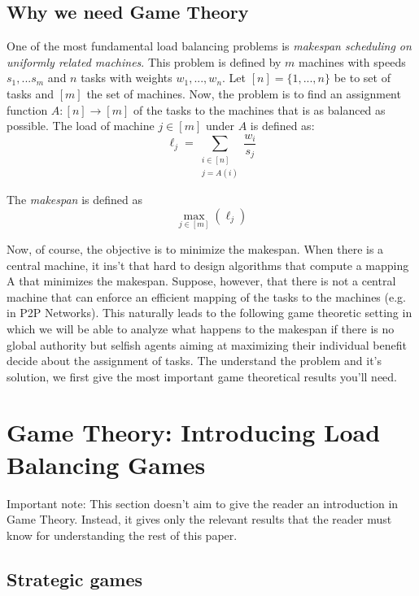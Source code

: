 \documentclass[a4paper,11pt]{article}
\begin{document}
\subsection{Why we need Game Theory}
 One of the most fundamental load balancing problems is \emph{makespan scheduling on uniformly related machines}. This problem is defined by $m$ machines with speeds $s_1,...s_m$ and $n$ tasks with weights $w_1,...,w_n$. Let $[n] = \{1,...,n\}$ be to set of tasks and $[m]$ the set of machines. Now, the problem is to find an assignment function $A: [n] \rightarrow [m]$ of the tasks to the machines that is as balanced as possible. The load of machine $j \in [m]$ under $A$ is defined as:
\begin{displaymath}
  \ell_j = \displaystyle\sum_{\substack{i \in [n] \\j = A(i)}}{\frac{w_i}{s_j}}
\end{displaymath}

The \emph{makespan} is defined as $$\max\limits_{j \in [m]}(\ell_j)$$

Now, of course, the objective is to minimize the makespan. When there is a central machine, it ins't that hard to design algorithms that compute a mapping A that minimizes the makespan. Suppose, however, that there is not a central machine that can enforce an efficient mapping of the tasks to the machines (e.g. in P2P Networks). This naturally leads to the following game theoretic setting in which we will be able to analyze what happens to the makespan if there is no global authority but selfish agents aiming at maximizing their individual benefit decide about the assignment of tasks. The understand the problem and it's solution, we first give the most important game theoretical results you'll need.

\section{Game Theory: Introducing Load Balancing Games}
Important note: This section doesn't aim to give the reader an introduction in Game Theory. Instead, it gives only the relevant results that the reader must know for understanding the rest of this paper.

\subsection{Strategic games}
\end{document}
